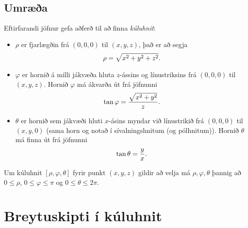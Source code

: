\documentclass[a4paper,10pt,icelandic]{sphinxmanual}
\begin{document}
\subsection{Umræða}
\label{Kafli4:id20}
Eftirfarandi jöfnur gefa aðferð til að finna \textit{kúluhnit}:
\begin{itemize}
\item {} 
\(\rho\) er fjarlægðin frá \((0,0,0)\) til \((x,y,z)\), það er að
segja
\begin{gather}
\begin{split}\displaystyle \rho=\sqrt{x^2+y^2+z^2}.\end{split}\notag
\end{gather}
\item {} 
\(\varphi\) er hornið á milli jákvæða hluta \(z\)-ássins og línustriksins frá
\((0,0,0)\) til \((x,y,z)\). Hornið \(\varphi\) má
ákvarða út frá jöfnunni
\begin{gather}
\begin{split}\displaystyle \tan\varphi=\frac{\sqrt{x^2+y^2}}{z}.\end{split}\notag
\end{gather}
\item {} 
\(\theta\) er hornið sem jákvæði hluti \(x\)-ásins myndar við línustrikið
frá \((0,0,0)\) til \((x,y,0)\) (sama horn og notað í
sívalningshnitum (og pólhnitum)). Hornið \(\theta\) má finna út
frá jöfnunni
\begin{gather}
\begin{split}\displaystyle \tan\theta=\frac{y}{x}.\end{split}\notag
\end{gather}
\end{itemize}

Um kúluhnit \([\rho, \varphi, \theta]\) fyrir punkt \((x,y,z)\)
gildir að velja má \(\rho, \varphi, \theta\) þannig að
\(0\leq \rho\), \(0\leq\varphi\leq \pi\) og
\(0\leq\theta\leq 2\pi\).


\section{Breytuskipti í kúluhnit}
\label{Kafli4:breytuskipti-i-kuluhnit}\label{Kafli4:index-15}
\end{document}
